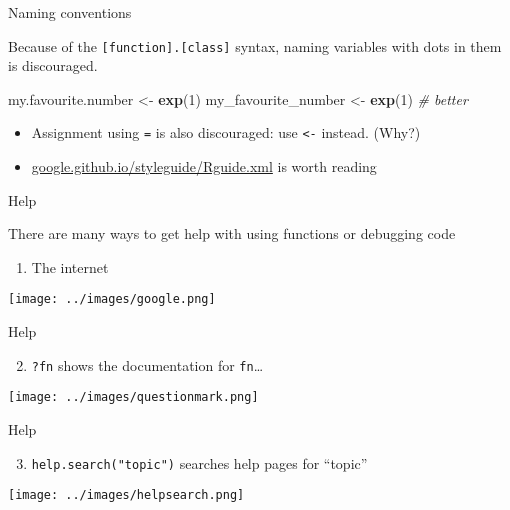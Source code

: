 \documentclass[ignorenonframetext,]{beamer}
\newenvironment{Shaded}{\begin{snugshade}}{\end{snugshade}}
\newcommand{\CommentTok}[1]{\textcolor[rgb]{0.56,0.35,0.01}{\textit{#1}}}
\newcommand{\DecValTok}[1]{\textcolor[rgb]{0.00,0.00,0.81}{#1}}
\newcommand{\KeywordTok}[1]{\textcolor[rgb]{0.13,0.29,0.53}{\textbf{#1}}}
\newcommand{\NormalTok}[1]{#1}
\newcommand{\StringTok}[1]{\textcolor[rgb]{0.31,0.60,0.02}{#1}}
\providecommand{\tightlist}{%
  \setlength{\itemsep}{0pt}\setlength{\parskip}{0pt}}
\begin{document}
\begin{frame}[fragile]{Naming conventions}
\protect\hypertarget{naming-conventions}{}

Because of the \texttt{{[}function{]}.{[}class{]}} syntax, naming
variables with dots in them is discouraged.

\begin{Shaded}
\begin{Highlighting}[]
\NormalTok{my.favourite.number <-}\StringTok{ }\KeywordTok{exp}\NormalTok{(}\DecValTok{1}\NormalTok{)}
\NormalTok{my_favourite_number <-}\StringTok{ }\KeywordTok{exp}\NormalTok{(}\DecValTok{1}\NormalTok{) }\CommentTok{# better}
\end{Highlighting}
\end{Shaded}

\begin{itemize}
\tightlist
\item
  Assignment using \texttt{=} is also discouraged: use
  \texttt{\textless{}-} instead. (Why?)
\item
  \url{google.github.io/styleguide/Rguide.xml} is worth reading
\end{itemize}

\end{frame}

\begin{frame}{Help}
\protect\hypertarget{help}{}

There are many ways to get help with using functions or debugging code

\begin{enumerate}
\tightlist
\item
  The internet
\end{enumerate}

\texttt{[image: ../images/google.png]}

\end{frame}

\begin{frame}[fragile]{Help}
\protect\hypertarget{help-1}{}

\begin{enumerate}
\setcounter{enumi}{1}
\tightlist
\item
  \texttt{?fn} shows the documentation for \texttt{fn}\ldots{}
\end{enumerate}

\texttt{[image: ../images/questionmark.png]}

\end{frame}

\begin{frame}[fragile]{Help}
\protect\hypertarget{help-2}{}

\begin{enumerate}
\setcounter{enumi}{2}
\tightlist
\item
  \texttt{help.search("topic")} searches help pages for ``topic''
\end{enumerate}

\texttt{[image: ../images/helpsearch.png]}

\end{frame}
\end{document}
